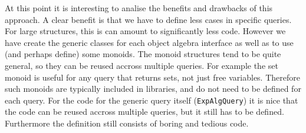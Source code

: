 \begin{comment}
\haoyuan{Begin: client code.}
Now one can do some experiments with this approach. First comes an example of the expression built up like this:


The method \lstinline{genExp()} just gives the expression \lstinline{x + (y + 2)}. And then an instance of \lstinline{FreeVars} is passed to \lstinline{genExp()} to get the names of free variables.
The result given by the following code is \lstinline{[x, y]}, which is a set of strings.


\haoyuan{End: client code. x + (y + 2) and [x, y] in code style?}
\end{comment}

At this point it is interesting to analise the benefits and drawbacks
of this approach. A clear benefit is that we have to define less cases
in specific queries. For large structures, this is can amount to
significantly less code. However we have create the generic
classes for each object algebra interface as well as to use (and
perhaps define) some monoids. The monoid structures tend to be
quite general, so they can be reused accross multiple queries. For example
the set monoid is useful for any query that returns sets, not just
free variables. Therefore such monoids are typically included in
libraries, and do not need to be defined for each query.
For the code for the generic query itself (\lstinline{ExpAlgQuery})
it is nice that the code can be reused accross multiple
queries, but it still has to be defined. Furthermore the definition still
consists of boring and tedious code.


\begin{comment}
But the result for an expression can only be a null list based on the
monoid. Thus in the freeVars query, furthermore, we expect the
variables to store their names into a list, and by using the monoid,
freeVars can be implemented. See Fig.~\ref{freevars_with_monoid}.


When the interface \lstinline{FreeVarsExpAlg} is used, an object of
the \lstinline{FreeVarsMonoid} is then created. As we can see, it is
needless for a user to write an exclusive traversal fully for a data
structure. Nothing but a monoid is required together with a few
methods being overwritten. And furthermore, a monoid can usually be
shared among query algebras with the same data type.
\end{comment}

